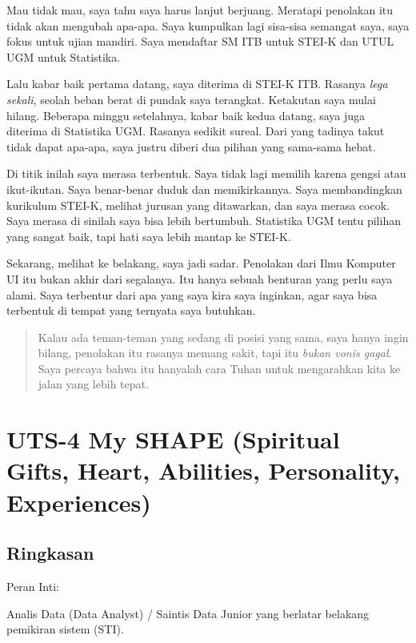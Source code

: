 \documentclass[
  letterpaper,
  DIV=11,
  numbers=noendperiod]{scrreprt}
\begin{document}
Mau tidak mau, saya tahu saya harus lanjut berjuang. Meratapi penolakan
itu tidak akan mengubah apa-apa. Saya kumpulkan lagi sisa-sisa semangat
saya, saya fokus untuk ujian mandiri. Saya mendaftar SM ITB untuk STEI-K
dan UTUL UGM untuk Statistika.

Lalu kabar baik pertama datang, saya diterima di STEI-K ITB. Rasanya
\emph{lega sekali}, seolah beban berat di pundak saya terangkat.
Ketakutan saya mulai hilang. Beberapa minggu setelahnya, kabar baik
kedua datang, saya juga diterima di Statistika UGM. Rasanya sedikit
sureal. Dari yang tadinya takut tidak dapat apa-apa, saya justru diberi
dua pilihan yang sama-sama hebat.

Di titik inilah saya merasa terbentuk. Saya tidak lagi memilih karena
gengsi atau ikut-ikutan. Saya benar-benar duduk dan memikirkannya. Saya
membandingkan kurikulum STEI-K, melihat jurusan yang ditawarkan, dan
saya merasa cocok. Saya merasa di sinilah saya bisa lebih bertumbuh.
Statistika UGM tentu pilihan yang sangat baik, tapi hati saya lebih
mantap ke STEI-K.

Sekarang, melihat ke belakang, saya jadi sadar. Penolakan dari Ilmu
Komputer UI itu bukan akhir dari segalanya. Itu hanya sebuah benturan
yang perlu saya alami. Saya terbentur dari apa yang saya kira saya
inginkan, agar saya bisa terbentuk di tempat yang ternyata saya
butuhkan.

\begin{quote}
Kalau ada teman-teman yang sedang di posisi yang sama, saya hanya ingin
bilang, penolakan itu rasanya memang sakit, tapi itu \emph{bukan vonis
gagal}. Saya percaya bahwa itu hanyalah cara Tuhan untuk mengarahkan
kita ke jalan yang lebih tepat.
\end{quote}


\chapter{UTS-4 My SHAPE (Spiritual Gifts, Heart, Abilities, Personality,
Experiences)}\label{uts-4-my-shape-spiritual-gifts-heart-abilities-personality-experiences}

\section{Ringkasan}\label{ringkasan}

Peran Inti:

Analis Data (Data Analyst) / Saintis Data Junior yang berlatar belakang
pemikiran sistem (STI).
\end{document}
